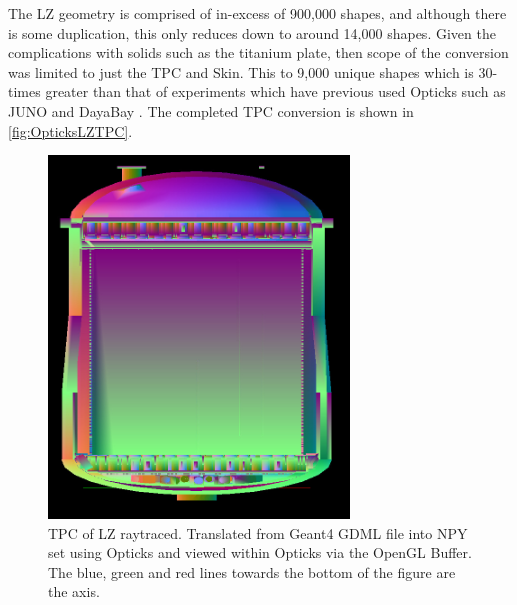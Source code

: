 \par
The LZ geometry is comprised of in-excess of 900,000 shapes, and although there is some duplication, this only reduces down to around 14,000 shapes.
Given the complications with solids such as the titanium plate, then scope of the conversion was limited to just the TPC and Skin.
This to 9,000 unique shapes which is 30-times greater than that of experiments which have previous used Opticks such as JUNO and DayaBay \cite{Opticks_CHEP_2021_ref}.
The completed TPC conversion is shown in \autoref{fig:OpticksLZTPC}.
\begin{figure}
\includegraphics[width=8cm]{Figures/Simulations/LZ_In_Opticks.png}
\centering
\caption{TPC of LZ raytraced. Translated from Geant4 GDML file into NPY set using Opticks and viewed within Opticks via the OpenGL Buffer.
The blue, green and red lines towards the bottom of the figure are the axis.}
\label{fig:OpticksLZTPC}
\end{figure}

